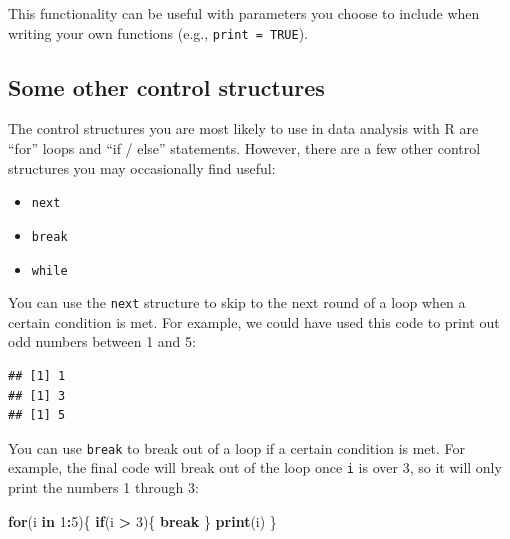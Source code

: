 \documentclass[]{book}
\makeatletter
\newenvironment{Shaded}{\begin{snugshade}}{\end{snugshade}}
\newcommand{\KeywordTok}[1]{\textcolor[rgb]{0.13,0.29,0.53}{\textbf{#1}}}
\newcommand{\DecValTok}[1]{\textcolor[rgb]{0.00,0.00,0.81}{#1}}
\newcommand{\StringTok}[1]{\textcolor[rgb]{0.31,0.60,0.02}{#1}}
\newcommand{\ControlFlowTok}[1]{\textcolor[rgb]{0.13,0.29,0.53}{\textbf{#1}}}
\newcommand{\OperatorTok}[1]{\textcolor[rgb]{0.81,0.36,0.00}{\textbf{#1}}}
\newcommand{\NormalTok}[1]{#1}
\providecommand{\tightlist}{%
  \setlength{\itemsep}{0pt}\setlength{\parskip}{0pt}}
\newenvironment{kframe}{%
\medskip{}
\setlength{\fboxsep}{.8em}
 \def\at@end@of@kframe{}%
 \ifinner\ifhmode%
  \def\at@end@of@kframe{\end{minipage}}%
  \begin{minipage}{\columnwidth}%
 \fi\fi%
 \def\FrameCommand##1{\hskip\@totalleftmargin \hskip-\fboxsep
 \colorbox{shadecolor}{##1}\hskip-\fboxsep
     \hskip-\linewidth \hskip-\@totalleftmargin \hskip\columnwidth}%
 \MakeFramed {\advance\hsize-\width
   \@totalleftmargin\z@ \linewidth\hsize
   \@setminipage}}%
 {\par\unskip\endMakeFramed%
 \at@end@of@kframe}
\renewenvironment{Shaded}{\begin{kframe}}{\end{kframe}}
\theoremstyle{definition}
\theoremstyle{definition}
\theoremstyle{definition}
\theoremstyle{remark}
\makeatother
\begin{document}
This functionality can be useful with parameters you choose to include
when writing your own functions (e.g., \texttt{print\ =\ TRUE}).

\subsection{Some other control
structures}\label{some-other-control-structures}

The control structures you are most likely to use in data analysis with
R are ``for'' loops and ``if / else'' statements. However, there are a
few other control structures you may occasionally find useful:

\begin{itemize}
\tightlist
\item
  \texttt{next}
\item
  \texttt{break}
\item
  \texttt{while}
\end{itemize}

You can use the \texttt{next} structure to skip to the next round of a
loop when a certain condition is met. For example, we could have used
this code to print out odd numbers between 1 and 5:

\begin{Shaded}
\end{Shaded}

\begin{verbatim}
## [1] 1
## [1] 3
## [1] 5
\end{verbatim}

You can use \texttt{break} to break out of a loop if a certain condition
is met. For example, the final code will break out of the loop once
\texttt{i} is over 3, so it will only print the numbers 1 through 3:

\begin{Shaded}
\begin{Highlighting}[]
\ControlFlowTok{for}\NormalTok{(i }\ControlFlowTok{in} \DecValTok{1}\OperatorTok{:}\DecValTok{5}\NormalTok{)\{}
  \ControlFlowTok{if}\NormalTok{(i }\OperatorTok{>}\StringTok{ }\DecValTok{3}\NormalTok{)\{}
    \ControlFlowTok{break}
\NormalTok{  \}}
  \KeywordTok{print}\NormalTok{(i)}
\NormalTok{\}}
\end{Highlighting}
\end{Shaded}
\end{document}
